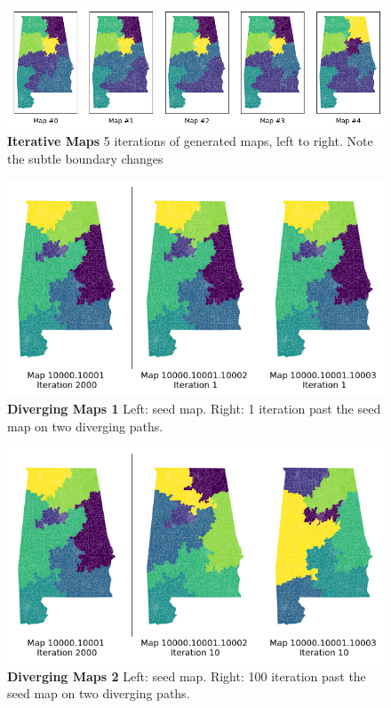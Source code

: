 \documentclass{article}
\begin{document}
\begin{figure}[t]\label{iterative maps}
    \centering
    \includegraphics[scale=.7]{images/changing_maps.png}
    \caption{\textbf{Iterative Maps} 5 iterations of generated maps, left to right. Note the subtle boundary changes}
\end{figure}

\begin{figure}[h]\label{diverge 1}
    \centering
    \includegraphics[scale=.8]{images/maps_1.png}
    \caption{\textbf{Diverging Maps 1} 
    Left: seed map. Right: 1 iteration past the seed map on two diverging paths.}
\end{figure}

\begin{figure}[h]\label{diverge 10}
    \centering
    \includegraphics[scale=.8]{images/maps_10.png}
    \caption{\textbf{Diverging Maps 2} Left: seed map. Right: 100 iteration past the seed map on two diverging paths.}
\end{figure}
\end{document}
